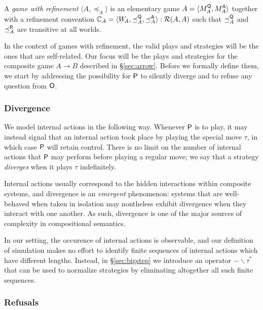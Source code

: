 \begin{definition}
A \emph{game with refinement} $\langle A, \preceq_A \rangle$
is an elementary game
$A = \langle M_A^{ \mathsf{Q} }, M_A^{ \mathsf{A} } \rangle$
together with a refinement convention
$\mathbb{C}_A = \langle W_{\!A}, {\preceq}_A^{ \mathsf{Q} }, {\preceq}_A^{ \mathsf{A} } \rangle
  : \mathcal{R}(A, A)$
such that $\preceq_A^{ \mathsf{Q} }$ and $\preceq_A^{ \mathsf{R} }$
are transitive at all worlds.
\end{definition}

In the context of games with refinement,
the valid plays and strategies will be the ones
that are self-related.
Our focus will be the plays and strategies
for the composite game $A \rightarrow B$
described in \S\ref{sec:arrow}.
Before we formally define them,
we start by addressing
the possibility for $ \mathsf{P} $ to silently diverge
and to refuse any question from $ \mathsf{O} $.

\subsubsection{Divergence}

We model internal actions in the following way.
Whenever $ \mathsf{P} $ is to play,
it may instead signal that an internal action took place
by playing the special move $\tau$,
in which case $ \mathsf{P} $ will retain control.
There is no limit on the number of internal actions that
$ \mathsf{P} $ may perform before playing a regular move;
we say that a strategy \emph{diverges}
when it plays $\tau$ indefinitely.

Internal actions usually correspond to the hidden interactions
within composite systems, and
divergence is an \emph{emergent} phenomenon:
systems that are well-behaved when taken in isolation
may nontheless exhibit divergence when they interact with one another.
As such,
divergence is one of the major sources of complexity
in compositional semantics.

In our setting,
the occurence of internal actions
is observable,
and our definition of simulation
makes no effort
to identify finite sequences of internal actions
which have different lengths.
Instead,
in \S\ref{sec:bigstep}
we introduce an operator $- \backslash \tau^*$
that can be used to normalize strategies
by eliminating altogether all such finite sequences.

\subsubsection{Refusals}

